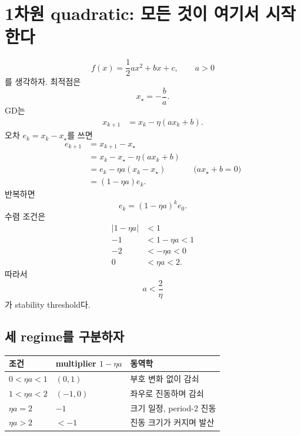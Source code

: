 \documentclass[11pt,a4paper,oneside,openany]{memoir}
\theoremstyle{definition}
\begin{document}
\section{1차원 quadratic: 모든 것이 여기서 시작한다}

\begin{equation}
  f(x)=\frac12 a x^2+bx+c,\qquad a>0
\end{equation}
를 생각하자. 최적점은
\begin{equation}
  x_\star=-\frac{b}{a}.
\end{equation}
GD는
\begin{align}
  x_{k+1}
  &=x_k-\eta(ax_k+b).
\end{align}
오차 $e_k=x_k-x_\star$를 쓰면
\begin{align}
  e_{k+1}
  &=x_{k+1}-x_\star\\
  &=x_k-x_\star-\eta(ax_k+b)\\
  &=e_k-\eta a(x_k-x_\star)
  &&\text{($ax_\star+b=0$)}\\
  &=(1-\eta a)e_k.
\end{align}
반복하면
\begin{equation}
  \boxed{e_k=(1-\eta a)^k e_0.}
  \label{eq:1d-gd}
\end{equation}
수렴 조건은
\begin{align}
  |1-\eta a|&<1\\
  -1&<1-\eta a<1\\
  -2&<-\eta a<0\\
  0&<\eta a<2.
\end{align}
따라서
\begin{equation}
  \boxed{a<\frac{2}{\eta}}
\end{equation}
가 stability threshold다.

\subsection{세 regime를 구분하자}

\begin{center}
\begin{tabular}{lll}
\toprule
조건 & multiplier $1-\eta a$ & 동역학 \\
\midrule
$0<\eta a<1$ & $(0,1)$ & 부호 변화 없이 감쇠 \\
$1<\eta a<2$ & $(-1,0)$ & 좌우로 진동하며 감쇠 \\
$\eta a=2$ & $-1$ & 크기 일정, period-2 진동 \\
$\eta a>2$ & $<-1$ & 진동 크기가 커지며 발산 \\
\bottomrule
\end{tabular}
\end{center}
\end{document}
